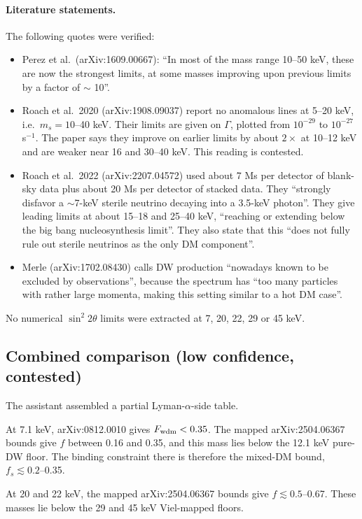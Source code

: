 \documentclass[11pt,a4paper]{article}
\begin{document}
\paragraph{Literature statements.} The following quotes were verified:
\begin{itemize}
\item Perez et al.\ (arXiv:1609.00667): ``In most of the mass range 10--50 keV, these are now the strongest limits, at some masses improving upon previous limits by a factor of $\sim$ 10''.
\item Roach et al.\ 2020 (arXiv:1908.09037) report no anomalous lines at 5--20 keV, i.e.\ $m_s=10$--40 keV. Their limits are given on $\Gamma$, plotted from $10^{-29}$ to $10^{-27}$ s$^{-1}$. The paper says they improve on earlier limits by about $2\times$ at 10--12 keV and are weaker near 16 and 30--40 keV. This reading is contested.
\item Roach et al.\ 2022 (arXiv:2207.04572) used about 7 Ms per detector of blank-sky data plus about 20 Ms per detector of stacked data. They ``strongly disfavor a $\sim$7-keV sterile neutrino decaying into a 3.5-keV photon''. They give leading limits at about 15--18 and 25--40 keV, ``reaching or extending below the big bang nucleosynthesis limit''. They also state that this ``does not fully rule out sterile neutrinos as the only DM component''.
\item Merle (arXiv:1702.08430) calls DW production ``nowadays known to be excluded by observations'', because the spectrum has ``too many particles with rather large momenta, making this setting similar to a hot DM case''.
\end{itemize}
No numerical $\sin^2 2\theta$ limits were extracted at 7, 20, 22, 29 or 45 keV.

\subsection{Combined comparison (low confidence, contested)}
The assistant assembled a partial Lyman-$\alpha$-side table.

At 7.1 keV, arXiv:0812.0010 gives $F_{\rm wdm}<0.35$. The mapped arXiv:2504.06367 bounds give $f$ between 0.16 and 0.35, and this mass lies below the 12.1 keV pure-DW floor. The binding constraint there is therefore the mixed-DM bound, $f_s\lesssim0.2$--0.35.

At 20 and 22 keV, the mapped arXiv:2504.06367 bounds give $f\lesssim0.5$--0.67. These masses lie below the 29 and 45 keV Viel-mapped floors.
\end{document}

